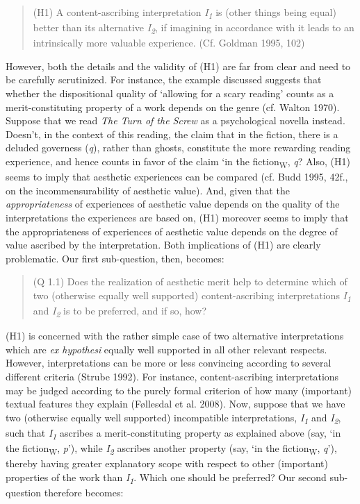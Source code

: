 \vspace{-.2cm}
\begin{quote}
(H1) A content-ascribing interpretation \emph{I\textsubscript{1}} is
(other things being equal) better than its alternative
\emph{I\textsubscript{2}}, if imagining in accordance with it leads to
an intrinsically more valuable experience. (Cf. Goldman 1995, 102)
\end{quote}
\vspace{-.2cm}

\noindent However, both the details and the validity of (H1) are far from clear
and need to be carefully scrutinized. For instance, the example
discussed suggests that whether the dispositional quality of `allowing
for a scary reading' counts as a merit-constituting property of a work
depends on the genre (cf. Walton 1970). Suppose that we read \emph{The
Turn of the Screw} as a psychological novella instead.{~ }Doesn't, in
the context of this reading, the claim that in the fiction, there is a
deluded governess (\emph{q}), rather than ghosts, constitute the more
rewarding reading experience, and hence counts in favor of the claim `in
the fiction\textsubscript{W}, \emph{q}? Also, (H1) seems to imply that
aesthetic experiences can be compared (cf. Budd 1995, 42f., on the
incommensurability of aesthetic value). And, given that the
\emph{appropriateness} of experiences of aesthetic value depends on the
quality of the interpretations the experiences are based on, (H1)
moreover seems to imply that the appropriateness of experiences of
aesthetic value depends on the degree of value ascribed by the
interpretation. Both implications of (H1) are clearly problematic. Our
first sub-question, then, becomes:

\vspace{-.2cm}
\begin{quote}
(Q 1.1)  Does the realization of aesthetic merit help to determine
which of two (otherwise equally well supported) content-ascribing
interpretations \emph{I\textsubscript{1}} and \emph{I\textsubscript{2}}
is to be preferred, and if so, how?
\end{quote}
\vspace{-.2cm}

\noindent (H1) is concerned with the rather simple case of two alternative
interpretations which are \emph{ex hypothesi} equally well supported in
all other relevant respects. However, interpretations can be more or
less convincing according to several different criteria (Strube 1992).
For instance, content-ascribing interpretations may be judged according
to the purely formal criterion of how many (important) textual features
they explain (F\o{}llesdal et al. 2008). Now, suppose that we have two
(otherwise equally well supported) incompatible interpretations,
\emph{I\textsubscript{1}} and \emph{I\textsubscript{2}}, such that
\emph{I\textsubscript{1}} ascribes a merit-constituting property as
explained above (say, `in the fiction\textsubscript{W}, \emph{p}'),
while \emph{I\textsubscript{2}} ascribes another property (say, `in the
fiction\textsubscript{W}, \emph{q}'), thereby having greater explanatory
scope with respect to other (important) properties of the work than
\emph{I\textsubscript{1}}. Which one should be preferred? Our second
sub-question therefore becomes:

